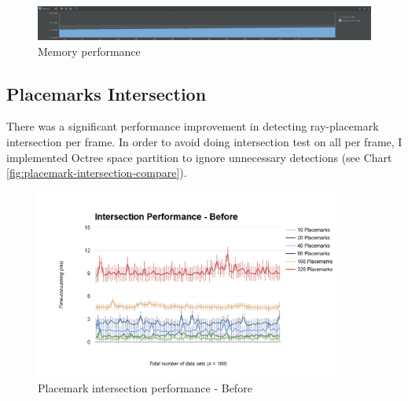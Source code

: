\begin{figure}[H]
	\caption{Memory performance}
	\label{fig:memory-performance}
	\centering
	\includegraphics[width=\textwidth, keepaspectratio]{Figures/memory-performance.png}
	\decoRule
\end{figure}

\subsection{Placemarks Intersection}
\label{section:placemarks-intersection}

There was a significant performance improvement in detecting ray-placemark intersection per frame. In order to avoid doing intersection test on all  per frame, I implemented Octree space partition to ignore unnecessary detections (see Chart \ref{fig:placemark-intersection-compare}).

\begin{figure}[H]
	\caption{Placemark intersection performance - Before}
	\label{fig:placemark-intersection-performance-before}
	\centering
	\includegraphics[width=0.9\textwidth, keepaspectratio]{Figures/placemark-intersection-performance-before.png}
	\decoRule
\end{figure}

